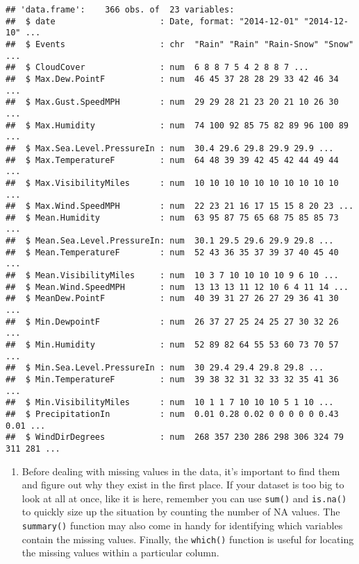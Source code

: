\documentclass[]{article}
\providecommand{\tightlist}{%
  \setlength{\itemsep}{0pt}\setlength{\parskip}{0pt}}
\begin{document}
\begin{verbatim}
## 'data.frame':    366 obs. of  23 variables:
##  $ date                     : Date, format: "2014-12-01" "2014-12-10" ...
##  $ Events                   : chr  "Rain" "Rain" "Rain-Snow" "Snow" ...
##  $ CloudCover               : num  6 8 8 7 5 4 2 8 8 7 ...
##  $ Max.Dew.PointF           : num  46 45 37 28 28 29 33 42 46 34 ...
##  $ Max.Gust.SpeedMPH        : num  29 29 28 21 23 20 21 10 26 30 ...
##  $ Max.Humidity             : num  74 100 92 85 75 82 89 96 100 89 ...
##  $ Max.Sea.Level.PressureIn : num  30.4 29.6 29.8 29.9 29.9 ...
##  $ Max.TemperatureF         : num  64 48 39 39 42 45 42 44 49 44 ...
##  $ Max.VisibilityMiles      : num  10 10 10 10 10 10 10 10 10 10 ...
##  $ Max.Wind.SpeedMPH        : num  22 23 21 16 17 15 15 8 20 23 ...
##  $ Mean.Humidity            : num  63 95 87 75 65 68 75 85 85 73 ...
##  $ Mean.Sea.Level.PressureIn: num  30.1 29.5 29.6 29.9 29.8 ...
##  $ Mean.TemperatureF        : num  52 43 36 35 37 39 37 40 45 40 ...
##  $ Mean.VisibilityMiles     : num  10 3 7 10 10 10 10 9 6 10 ...
##  $ Mean.Wind.SpeedMPH       : num  13 13 13 11 12 10 6 4 11 14 ...
##  $ MeanDew.PointF           : num  40 39 31 27 26 27 29 36 41 30 ...
##  $ Min.DewpointF            : num  26 37 27 25 24 25 27 30 32 26 ...
##  $ Min.Humidity             : num  52 89 82 64 55 53 60 73 70 57 ...
##  $ Min.Sea.Level.PressureIn : num  30 29.4 29.4 29.8 29.8 ...
##  $ Min.TemperatureF         : num  39 38 32 31 32 33 32 35 41 36 ...
##  $ Min.VisibilityMiles      : num  10 1 1 7 10 10 10 5 1 10 ...
##  $ PrecipitationIn          : num  0.01 0.28 0.02 0 0 0 0 0 0.43 0.01 ...
##  $ WindDirDegrees           : num  268 357 230 286 298 306 324 79 311 281 ...
\end{verbatim}

\begin{enumerate}
\def\labelenumi{\arabic{enumi}.}
\setcounter{enumi}{7}
\tightlist
\item
  Before dealing with missing values in the data, it's important to find
  them and figure out why they exist in the first place. If your dataset
  is too big to look at all at once, like it is here, remember you can
  use \texttt{sum()} and \texttt{is.na()} to quickly size up the
  situation by counting the number of NA values. The \texttt{summary()}
  function may also come in handy for identifying which variables
  contain the missing values. Finally, the \texttt{which()} function is
  useful for locating the missing values within a particular column.
\end{enumerate}
\end{document}
